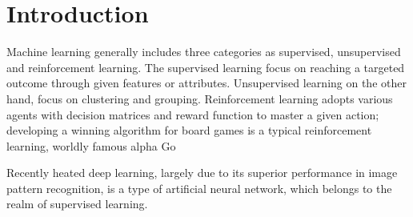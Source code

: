 \section{Introduction}

Machine learning generally includes three categories as supervised, unsupervised and reinforcement learning. The supervised learning focus on reaching a targeted outcome through given features or attributes. Unsupervised learning on the other hand, focus on clustering and grouping. Reinforcement learning adopts various agents with decision matrices and reward function to master a given action; developing a winning algorithm for board games is a typical reinforcement learning, worldly famous alpha Go
\par
Recently heated deep learning, largely due to its superior performance in image pattern recognition, is a type of artificial neural network, which belongs to the realm of supervised learning. 
